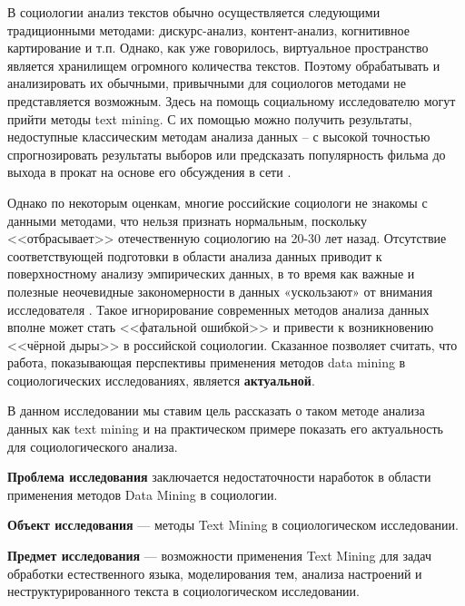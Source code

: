 В социологии анализ текстов обычно осуществляется следующими традиционными методами: дискурс-анализ,  контент-анализ, когнитивное картирование и т.п. Однако, как уже говорилось, виртуальное пространство является хранилищем огромного количества текстов. Поэтому обрабатывать и анализировать их обычными, привычными для социологов методами не  представляется возможным. Здесь на помощь социальному исследователю могут прийти методы text mining. С их помощью можно получить результаты, недоступные классическим методам анализа данных --  с высокой точностью спрогнозировать результаты выборов \cite{venezuala} или предсказать популярность фильма до выхода в прокат на основе его обсуждения в сети \cite{hp_predicting}. 

Однако по некоторым оценкам, многие российские социологи не знакомы с данными методами, что нельзя признать нормальным, поскольку <<отбрасывает>> отечественную социологию на 20-30 лет назад. Отсутствие соответствующей подготовки в области анализа данных приводит к поверхностному анализу эмпирических данных, в то время как важные и полезные неочевидные закономерности в данных «ускользают» от внимания исследователя \cite{Davydov_Knowledge}. Такое игнорирование современных методов анализа данных вполне может стать <<фатальной ошибкой>> \cite{Davidov_fatal} и привести к возникновению <<чёрной дыры>> \cite{black_hole} в российской социологии. Сказанное позволяет считать, что работа, показывающая перспективы применения методов data mining в социологических исследованиях, является \textbf{актуальной}.

В данном исследовании мы ставим цель рассказать о таком методе анализа данных как text mining и на практическом примере показать его актуальность для социологического анализа.

\textbf{Проблема исследования} заключается недостаточности наработок в области применения методов Data Mining в социологии.

\textbf{Объект исследования} --- методы Text Mining в социологическом исследовании.

\textbf{Предмет исследования} --- возможности применения Text Mining для задач обработки естественного языка, моделирования тем, анализа настроений и неструктурированного текста в социологическом исследовании.
\clearpage